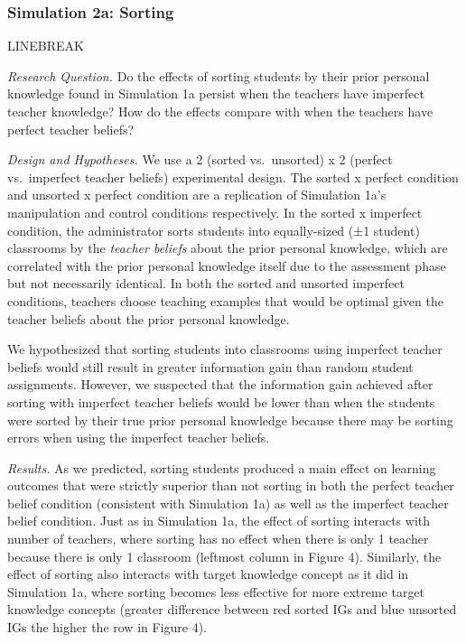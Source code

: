 \documentclass[10pt, letterpaper]{article}
\begin{document}
\subsubsection{Simulation 2a: Sorting}\label{simulation-2a-sorting}

LINEBREAK

\emph{Research Question. } Do the effects of sorting students by their
prior personal knowledge found in Simulation 1a persist when the
teachers have imperfect teacher knowledge? How do the effects compare
with when the teachers have perfect teacher beliefs?

\emph{Design and Hypotheses. } We use a 2 (sorted vs.~unsorted) x 2
(perfect vs.~imperfect teacher beliefs) experimental design. The sorted
x perfect condition and unsorted x perfect condition are a replication
of Simulation 1a's manipulation and control conditions respectively. In
the sorted x imperfect condition, the administrator sorts students into
equally-sized (±1 student) classrooms by the \emph{teacher beliefs}
about the prior personal knowledge, which are correlated with the prior
personal knowledge itself due to the assessment phase but not
necessarily identical. In both the sorted and unsorted imperfect
conditions, teachers choose teaching examples that would be optimal
given the teacher beliefs about the prior personal knowledge.

We hypothesized that sorting students into classrooms using imperfect
teacher beliefs would still result in greater information gain than
random student assignments. However, we suspected that the information
gain achieved after sorting with imperfect teacher beliefs would be
lower than when the students were sorted by their true prior personal
knowledge because there may be sorting errors when using the imperfect
teacher beliefs.

\emph{Results. } As we predicted, sorting students produced a main
effect on learning outcomes that were strictly superior than not sorting
in both the perfect teacher belief condition (consistent with Simulation
1a) as well as the imperfect teacher belief condition. Just as in
Simulation 1a, the effect of sorting interacts with number of teachers,
where sorting has no effect when there is only 1 teacher because there
is only 1 classroom (leftmost column in Figure 4). Similarly, the effect
of sorting also interacts with target knowledge concept as it did in
Simulation 1a, where sorting becomes less effective for more extreme
target knowledge concepts (greater difference between red sorted IGs and
blue unsorted IGs the higher the row in Figure 4).
\end{document}
